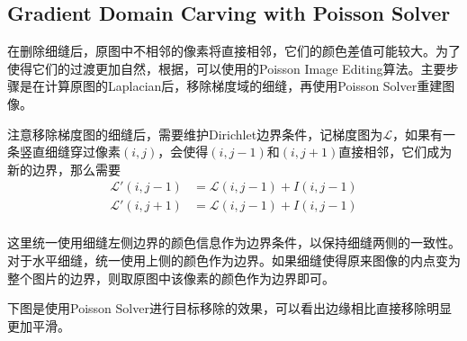 \documentclass[twoside,a4paper,4pt]{article}
\begin{document}
\subsection{Gradient Domain Carving with Poisson Solver}
在删除细缝后，原图中不相邻的像素将直接相邻，它们的颜色差值可能较大。为了使得它们的过渡更加自然，根据\cite{avidan2007seam}，可以使用\cite{Perez03a}的Poisson Image Editing算法。主要步骤是在计算原图的Laplacian后，移除梯度域的细缝，再使用Poisson Solver重建图像。\par
注意移除梯度图的细缝后，需要维护Dirichlet边界条件，记梯度图为$\mathcal{L}$，如果有一条竖直细缝穿过像素$(i,j)$，会使得$(i,j-1)$和$(i,j+1)$直接相邻，它们成为新的边界，那么需要
$$
\begin{aligned}
    \mathcal{L}'(i,j-1) & = \mathcal{L}(i,j-1) + I(i, j-1) \\
    \mathcal{L}'(i,j+1) & = \mathcal{L}(i,j-1) + I(i, j-1) \\
\end{aligned}
$$\par
这里统一使用细缝左侧边界的颜色信息作为边界条件，以保持细缝两侧的一致性。对于水平细缝，统一使用上侧的颜色作为边界。如果细缝使得原来图像的内点变为整个图片的边界，则取原图中该像素的颜色作为边界即可。\par
下图是使用Poisson Solver进行目标移除的效果，可以看出边缘相比直接移除明显更加平滑。
\end{document}
